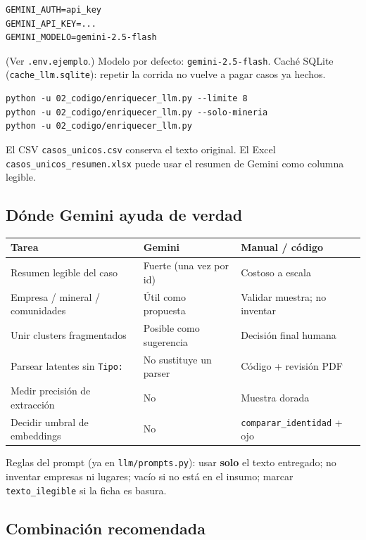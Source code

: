 \documentclass[11pt,a4paper]{article}
\begin{document}
\begin{verbatim}
GEMINI_AUTH=api_key
GEMINI_API_KEY=...
GEMINI_MODELO=gemini-2.5-flash
\end{verbatim}

(Ver \texttt{.env.ejemplo}.) Modelo por defecto: \texttt{gemini-2.5-flash}. Caché SQLite (\texttt{cache\_llm.sqlite}): repetir la corrida no vuelve a pagar casos ya hechos.

\begin{verbatim}
python -u 02_codigo/enriquecer_llm.py --limite 8
python -u 02_codigo/enriquecer_llm.py --solo-mineria
python -u 02_codigo/enriquecer_llm.py
\end{verbatim}

El CSV \texttt{casos\_unicos.csv} conserva el texto original. El Excel \texttt{casos\_unicos\_resumen.xlsx} puede usar el resumen de Gemini como columna legible.

\subsection{Dónde Gemini ayuda de verdad}

\begin{center}
\renewcommand{\arraystretch}{1.15}
\begin{tabularx}{\textwidth}{@{}l Y Y@{}}
\toprule
\textbf{Tarea} & \textbf{Gemini} & \textbf{Manual / código} \\
\midrule
Resumen legible del caso & Fuerte (una vez por id) & Costoso a escala \\
Empresa / mineral / comunidades & Útil como propuesta & Validar muestra; no inventar \\
Unir clusters fragmentados & Posible como sugerencia & Decisión final humana \\
Parsear latentes sin \texttt{Tipo:} & No sustituye un parser & Código + revisión PDF \\
Medir precisión de extracción & No & Muestra dorada \\
Decidir umbral de embeddings & No & \texttt{comparar\_identidad} + ojo \\
\bottomrule
\end{tabularx}
\end{center}

Reglas del prompt (ya en \texttt{llm/prompts.py}): usar \textbf{solo} el texto entregado; no inventar empresas ni lugares; vacío si no está en el insumo; marcar \texttt{texto\_ilegible} si la ficha es basura.

\subsection{Combinación recomendada}
\end{document}
